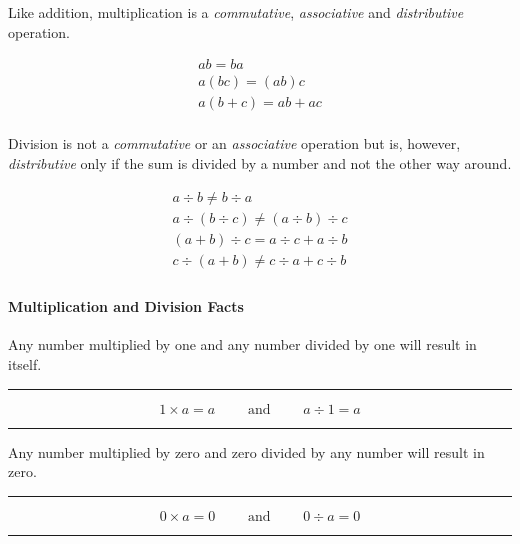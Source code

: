 \documentclass[a5paper,9pt]{book}
\theoremstyle{definition}
\newcommand{\txtlinesur}[1]{%
    \vspace*{\baselineskip}

    \hrule%

    \vspace*{\medskipamount}

    #1

    \vspace*{\medskipamount}

    \hrule%

    \vspace*{\baselineskip}
}
\begin{document}
                Like addition, multiplication is a \emph{commutative}, \emph{associative}
                and \emph{distributive} operation.

                \begin{gather*}
                    ab = ba \\[5pt]
                    a(bc) = (ab)c \\[5pt]
                    a(b+c) = ab + ac \\
                \end{gather*}

                Division is not a \emph{commutative} or an \emph{associative} operation
                but is, however, \emph{distributive} only if the sum is divided by a number
                and not the other way around.

                \begin{gather*}
                    a\div b \neq b\div a \\[5pt]
                    a\div(b\div c) \neq (a\div b)\div c \\[5pt]
                    (a + b)\div c = a\div c + a\div b \\[5pt]
                    c\div (a+b) \neq c\div a + c\div b \\
                \end{gather*}

                \paragraph{Multiplication and Division Facts}

                Any number multiplied by one and any number divided by one will result
                in itself.

                \txtlinesur{%
                    \begin{equation*}
                        1\times a = a \qquad\text{ and }\qquad a\div 1 = a
                    \end{equation*}
                }

                Any number multiplied by zero and zero divided by any number will result
                in zero.

                \txtlinesur{%
                    \begin{equation*}
                        0\times a = 0 \qquad\text{ and }\qquad 0\div a = 0
                    \end{equation*}
                }
\end{document}
